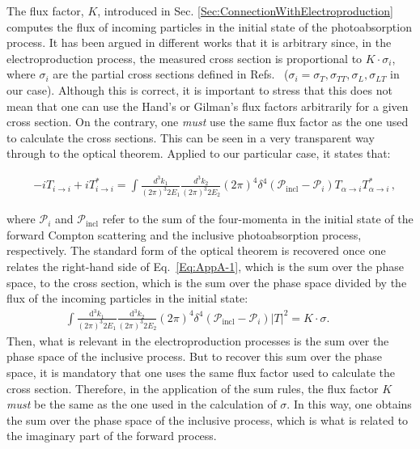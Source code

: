\documentclass[twocolumn,prc,showpacs,nofootinbib,preprintnumbers,amsmath,amssymb,superscriptaddress]{revtex4-1}
\def\dd{\mathrm{d}}
\begin{document}
The flux factor, $K$, introduced in Sec. \ref{Sec:ConnectionWithElectroproduction} computes the flux of incoming particles in the initial state of the photoabsorption process. 
It has been argued in different works that it is arbitrary since, in the electroproduction process, the measured cross section is proportional to $K\cdot \sigma_i$, where $\sigma_i$ are the partial cross sections defined in Refs.~\cite{Drechsel:2000ct, Drechsel:2002ar} ($\sigma_i=\sigma_T,\sigma_{TT},\sigma_L,\sigma_{LT}$ in our case). 
Although this is correct, it is important to stress that this does not mean that one can use the Hand's \cite{Hand:1963bb}  or Gilman's \cite{Gilman:1967sn}  flux factors arbitrarily for a given cross section. On the contrary, one {\itshape must}  use the same flux factor as the one used to calculate the cross sections.   
 This can be seen in a very transparent way through to the optical theorem. Applied to our particular case, it states that:
\begin{widetext}
\begin{align}\label{Eq:AppA-1}
&- i T_{i\to i } + i T_{i\to i }^*= \int\!\!\!\! \frac{d^3 k_1 }{(2\pi)^3 2E_1} \frac{d^3 k_{2} }{(2\pi)^3 2E_{2}} (2\pi)^4 \delta^4 (\mathcal{P}_\mathrm{incl} - \mathcal{P}_i) T_{\alpha \to i}  T_{\alpha \to i}^* \,,
\end{align}
\end{widetext}
where $\mathcal{P}_{i}$ and $\mathcal{P}_\mathrm{incl}$ refer to the sum of the four-momenta in the initial state of the forward Compton scattering and the inclusive photoabsorption process, respectively.
The standard form of the optical theorem is recovered once one relates the right-hand side of Eq.~\eqref{Eq:AppA-1}, which is the sum over the phase space, to the cross section, which is the sum over the phase space divided by the flux of the incoming particles in the initial state:
\begin{align}\label{Eq:AppA-2}
 \int\!\!\!\! \frac{\dd^3 k_1 }{(2\pi)^3 2E_1} \frac{\dd^3 k_{2} }{(2\pi)^3 2E_{2}} (2\pi)^4 \delta^4 (\mathcal{P}_\mathrm{incl} - \mathcal{P}_i) |T|^2 = K\cdot \sigma. \qquad\;
\end{align}
Then, what is relevant in the electroproduction processes is the sum over the phase space of the inclusive process.
But to recover this sum over the phase space, it is mandatory that one uses the same flux factor used to calculate the cross section. 
Therefore, in the application of the sum rules, the flux factor $K$ {\itshape must} be the same as the one used in the calculation of $\sigma$.
In this way, one obtains the sum over the phase space of the inclusive process, which is what is related to the imaginary part of the forward process.
\end{document}
